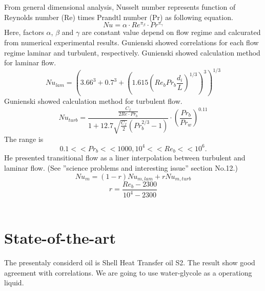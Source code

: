 \documentclass[conference]{IEEEtran}
\begin{document}
From general dimensional analysis, Nusselt number represents function of Reynolds number (Re) times Prandtl number (Pr) as following equation.
\begin{equation}
Nu=\alpha \cdot Re^{\pi_{\beta}}\cdot Pr^{\pi_{\gamma}}\label{Nu_dimensional}
\end{equation}
Here, factors $\alpha$, $\beta$ and $\gamma$ are constant value depend on flow regime and calcurated from numerical experimental results.
Gunienski\cite{Gnienlinski2010} showed correlations for each flow regime laminar and turbulent, respectively.
Gunienski\cite{Gnienlinski2010} showed calculation method for laminar flow.
\begin{equation}
Nu_{lam}=(3.66^{3}+0.7^{3}+(1.615(Re_{b}Pr_{b}\frac{d_{i}}{L})^{1/3})^{3})^{1/3}\label{Nu_laminar}
\end{equation}
Gunienski\cite{Gnienlinski2010} showed calculation method for turbulent flow.
\begin{equation}
Nu_{turb}=\frac{\frac{C_{f}}{2Re\cdot Pr_{b}}}{1+12.7 \sqrt{\frac{C_{f}}{2}}(Pr_{b}^{2/3}-1)}\cdot (\frac{Pr_{b}}{Pr_{w}})^{0.11}
\end{equation}
The range is
\begin{equation}
0.1<<Pr_{b}<<1000, 10^{4}<<Re_{b}<<10^{6}.
\end{equation}
He presented transitional flow as a liner interpolation between turbulent and laminar flow.
(See ''science problems and interesting issue'' section No.12.)
\begin{equation}
Nu_{m}=(1-r)Nu_{m,lam}+rNu_{m,turb}
\label{Nu_m}
\end{equation}
\begin{equation}
r=\frac{Re_{b}-2300}{10^{4}-2300}
\end{equation}
\\

\section{State-of-the-art}
The presentaly considerd oil is Shell Heat Transfer oil S2.
The result show good agreement with correlations.
We are going to use water-glycole as a operationg liquid.\\
\end{document}
